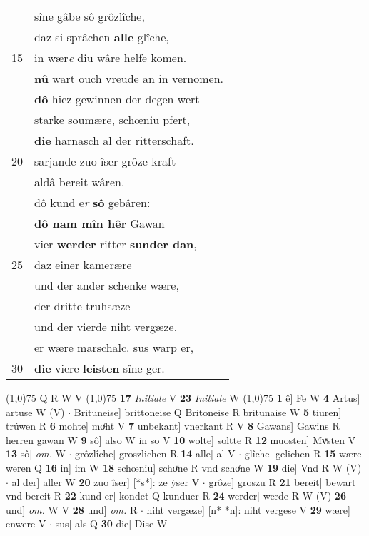 \documentclass[8pt,a4paper,notitlepage]{article}
\begin{document}
\begin{table}[ht]
\begin{minipage}[t]{0.5\linewidth}
\begin{tabular}{rl}
 & sîne gâbe sô grôzlîche,\\ 
 & daz si sprâchen \textbf{alle} glîche,\\ 
15 & in wær\textit{e} diu wâre helfe komen.\\ 
 & \textbf{nû} wart ouch vreude an in vernomen.\\ 
 & \textbf{dô} hiez gewinnen der degen wert\\ 
 & starke soumære, schœniu pfert,\\ 
 & \textbf{die} harnasch al der ritterschaft.\\ 
20 & sarjande zuo îser grôze kraft\\ 
 & aldâ bereit wâren.\\ 
 & dô kund e\textit{r} \textbf{sô} gebâren:\\ 
 & \textbf{dô nam mîn hêr} Gawan\\ 
 & vier \textbf{werder} ritter \textbf{sunder dan},\\ 
25 & daz einer kamerære\\ 
 & und der ander schenke wære,\\ 
 & der dritte truhsæze\\ 
 & und der vierde niht vergæze,\\ 
 & er wære marschalc. sus warp er,\\ 
30 & \textbf{die} viere \textbf{leisten} sîne ger.\\ 
\end{tabular}
\scriptsize
\line(1,0){75} \newline
Q R W V \newline
\line(1,0){75} \newline
\textbf{17} \textit{Initiale} V  \textbf{23} \textit{Initiale} W  \newline
\line(1,0){75} \newline
\textbf{1} ê] Fe W \textbf{4} Artus] artuse W (V)  $\cdot$ Brituneise] brittoneise Q Britoneise R britunaise W \textbf{5} tiuren] trúwen R \textbf{6} mohte] moͤht V \textbf{7} unbekant] vnerkant R V \textbf{8} Gawans] Gawins R herren gawan W \textbf{9} sô] also W in so V \textbf{10} wolte] soltte R \textbf{12} muosten] Mvͤsten V \textbf{13} sô] \textit{om.} W  $\cdot$ grôzlîche] groszlichen R \textbf{14} alle] al V  $\cdot$ glîche] gelichen R \textbf{15} wære] weren Q \textbf{16} in] im W \textbf{18} schœniu] schoͯne R vnd schoͤne W \textbf{19} die] Vnd R W (V)  $\cdot$ al der] aller W \textbf{20} zuo îser] [*s*]: ze ẏser V  $\cdot$ grôze] groszu R \textbf{21} bereit] bewart vnd bereit R \textbf{22} kund er] kondet Q kunduer R \textbf{24} werder] werde R W (V) \textbf{26} und] \textit{om.} W V \textbf{28} und] \textit{om.} R  $\cdot$ niht vergæze] [n* *n]: niht vergese V \textbf{29} wære] enwere V  $\cdot$ sus] als Q \textbf{30} die] Dise W \newline
\end{minipage}
\end{table}
\end{document}
